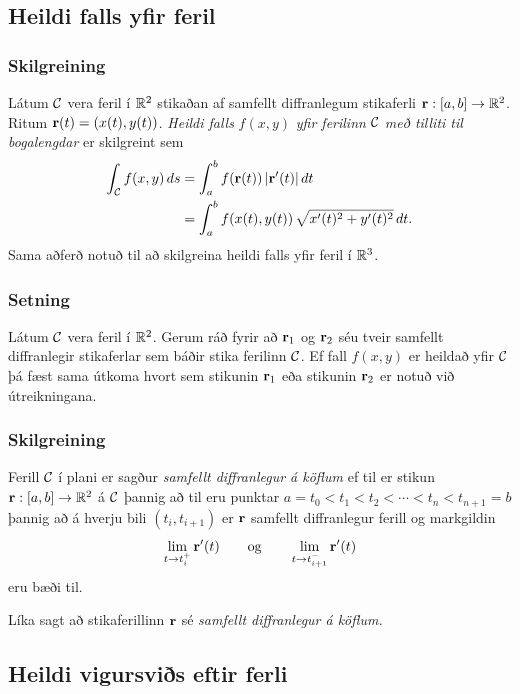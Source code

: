 \subsection{Heildi falls yfir feril} 

\subsubsection{Skilgreining }
Látum $\cal C$ vera feril í ${\mathbb R}^2$ stikaðan af samfellt diffranlegum stikaferli $\mbox{${\bf r}$}:[a,b]\rightarrow{\mathbb R}^2$.  Ritum $\mbox{${\bf r}$}(t)=(x(t),y(t))$.  {\em Heildi falls} $f(x,y)$ {\em yfir ferilinn} $\cal C$ {\em með tilliti til bogalengdar} er skilgreint sem 
\begin{align*}  
\int_{\cal C}f(x,y)\,ds&=\int_a^b f(\mbox{${\bf r}$}(t))\,|\mbox{${\bf r}$}'(t)|\,dt\\
&=\int_a^b f(x(t),y(t))\,\sqrt{x'(t)^2+y'(t)^2}\,dt.\end{align*}
Sama aðferð notuð til að skilgreina heildi falls yfir feril í ${\mathbb R}^3$.



\subsubsection{Setning }
 Látum $\cal C$ vera feril í ${\mathbb R}^2$.  Gerum ráð fyrir að $\mbox{${\bf r}$}_1$ og $\mbox{${\bf r}$}_2$ séu tveir samfellt diffranlegir stikaferlar sem báðir stika ferilinn $\cal C$.  Ef fall $f(x,y)$ er heildað yfir $\cal C$ þá fæst sama útkoma hvort sem stikunin $\mbox{${\bf r}$}_1$ eða stikunin $\mbox{${\bf r}$}_2$ er notuð við útreikningana.




\subsubsection{Skilgreining }
Ferill $\cal C$ í plani er sagður {\em samfellt diffranlegur á köflum} ef til er stikun $\mbox{${\bf r}$}:[a,b]\rightarrow {\mathbb R}^2$ á $\cal C$ þannig að  til eru punktar $a=t_0<t_1<t_2<\cdots<t_n<t_{n+1}=b$ þannig að á hverju bili $(t_i,t_{i+1})$ er $\mbox{${\bf r}$}$ samfellt diffranlegur ferill og markgildin
$$\lim_{t\rightarrow t_i^+}\mbox{${\bf r}$}'(t)\qquad\mbox{og}\qquad 
\lim_{t\rightarrow t_{i+1}^-}\mbox{${\bf r}$}'(t)$$
eru bæði til.  

Líka sagt að stikaferillinn $\mbox{${\bf r}$}$ sé {\em samfellt diffranlegur á köflum.}



\subsection{Heildi vigursviðs eftir ferli} 

